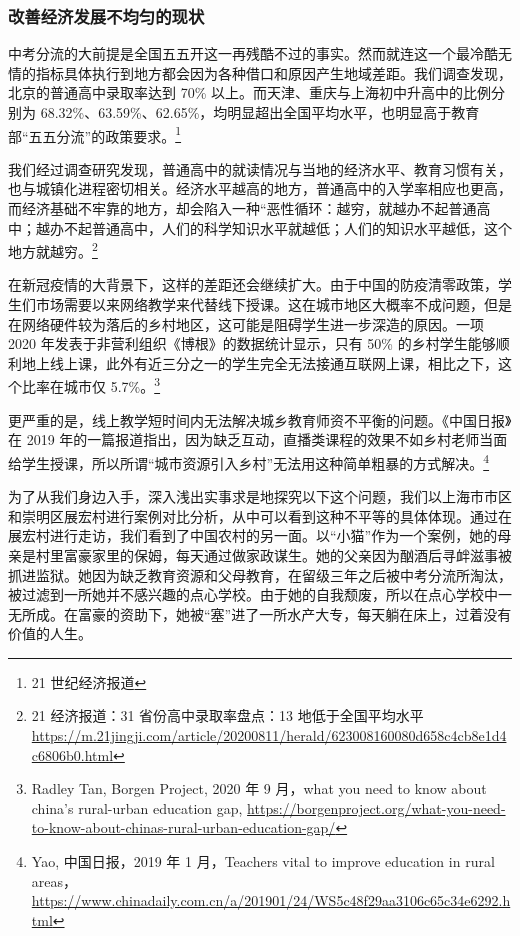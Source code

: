 \documentclass[12pt,UTF8]{ctexart}
\begin{document}
\subsubsection {改善经济发展不均匀的现状}
\par{中考分流的大前提是全国五五开这一再残酷不过的事实。然而就连这一个最冷酷无情的指标具体执行到地方都会因为各种借口和原因产生地域差距。我们调查发现，北京的普通高中录取率达到
	70\% 以上。而天津、重庆与上海初中升高中的比例分别为
	68.32\%、63.59\%、62.65\%，均明显超出全国平均水平，也明显高于教育部“五五分流”的政策要求。\footnote{21 世纪经济报道}}
\par{我们经过调查研究发现，普通高中的就读情况与当地的经济水平、教育习惯有关，也与城镇化进程密切相关。经济水平越高的地方，普通高中的入学率相应也更高，而经济基础不牢靠的地方，却会陷入一种“恶性循环：越穷，就越办不起普通高中；越办不起普通高中，人们的科学知识水平就越低；人们的知识水平越低，这个地方就越穷。\footnote{21
		经济报道：31 省份高中录取率盘点：13 地低于全国平均水平
		\url{https://m.21jingji.com/article/20200811/herald/623008160080d658c4cb8e1d4c6806b0.html}}}
\par{在新冠疫情的大背景下，这样的差距还会继续扩大。由于中国的防疫清零政策，学生们市场需要以来网络教学来代替线下授课。这在城市地区大概率不成问题，但是在网络硬件较为落后的乡村地区，这可能是阻碍学生进一步深造的原因。一项
	2020 年发表于非营利组织《博根》的数据统计显示，只有 50\%
	的乡村学生能够顺利地上线上课，此外有近三分之一的学生完全无法接通互联网上课，相比之下，这个比率在城市仅 5.7\%。\footnote{Radley Tan,
		Borgen Project, 2020 年 9 月，what you need to know about china's rural-urban
		education gap,
		\url{https://borgenproject.org/what-you-need-to-know-about-chinas-rural-urban-education-gap/}}}
\par{更严重的是，线上教学短时间内无法解决城乡教育师资不平衡的问题。《中国日报》在 2019
	年的一篇报道指出，因为缺乏互动，直播类课程的效果不如乡村老师当面给学生授课，所以所谓“城市资源引入乡村”无法用这种简单粗暴的方式解决。\footnote{Yao,
		中国日报，2019 年 1 月，Teachers vital to improve education in rural
		areas，\url{https://www.chinadaily.com.cn/a/201901/24/WS5c48f29aa3106c65c34e6292.html}}}
\par{为了从我们身边入手，深入浅出实事求是地探究以下这个问题，我们以上海市市区和崇明区展宏村进行案例对比分析，从中可以看到这种不平等的具体体现。通过在展宏村进行走访，我们看到了中国农村的另一面。以“小猫”作为一个案例，她的母亲是村里富豪家里的保姆，每天通过做家政谋生。她的父亲因为酗酒后寻衅滋事被抓进监狱。她因为缺乏教育资源和父母教育，在留级三年之后被中考分流所淘汰，被过滤到一所她并不感兴趣的点心学校。由于她的自我颓废，所以在点心学校中一无所成。在富豪的资助下，她被“塞”进了一所水产大专，每天躺在床上，过着没有价值的人生。}
\end{document}
